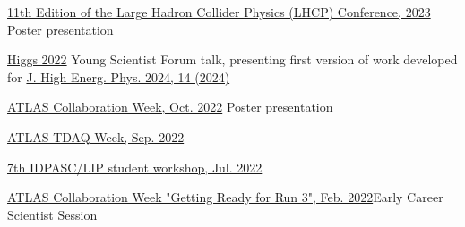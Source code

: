 \begin{cventries}
    {}
    {}
    {\href{https://indico.cern.ch/event/1198609/contributions/5340462/}{11th Edition of the Large Hadron Collider Physics (LHCP) Conference, 2023 }}
    {Poster presentation}\vspace*{2mm}

    {}
    {}
    {\href{https://indico.cern.ch/event/1086716/contributions/5049260/}{Higgs 2022}}
    {Young Scientist Forum talk, presenting first version of work developed for \href{https://doi.org/10.1007/JHEP04(2024)014}{J. High Energ. Phys. 2024, 14 (2024)}}\vspace*{2mm}

    {}
    {}
    {\href{https://indico.cern.ch/event/1187086/\#37-the-atlas-jet-trigger-in-ru}{ATLAS Collaboration Week, Oct. 2022}}
    {Poster presentation}\vspace*{2mm}

    {}
    {}
    {\href{https://indico.cern.ch/event/1172448/contributions/4924082/}{ATLAS TDAQ Week, Sep. 2022}}
    {}\vspace*{2mm}


    {\href{https://indico.lip.pt/event/1245/}{7th IDPASC/LIP student workshop, Jul. 2022}}{}

    {}
    {}
    {\href{https://indico.cern.ch/event/1108354/\#167-readiness-of-the-jet-trigg}{ATLAS Collaboration Week "Getting Ready for Run 3", Feb. 2022}}{Early Career Scientist Session}
    
    


\end{cventries}
